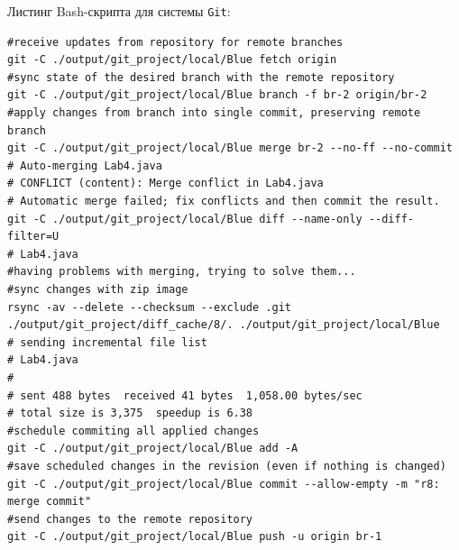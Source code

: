Листинг Bash-скрипта для системы \texttt{Git}:
\begin{lstlisting}
#receive updates from repository for remote branches
git -C ./output/git_project/local/Blue fetch origin
#sync state of the desired branch with the remote repository
git -C ./output/git_project/local/Blue branch -f br-2 origin/br-2
#apply changes from branch into single commit, preserving remote branch
git -C ./output/git_project/local/Blue merge br-2 --no-ff --no-commit
# Auto-merging Lab4.java
# CONFLICT (content): Merge conflict in Lab4.java
# Automatic merge failed; fix conflicts and then commit the result.
git -C ./output/git_project/local/Blue diff --name-only --diff-filter=U
# Lab4.java
#having problems with merging, trying to solve them...
#sync changes with zip image
rsync -av --delete --checksum --exclude .git ./output/git_project/diff_cache/8/. ./output/git_project/local/Blue
# sending incremental file list
# Lab4.java
# 
# sent 488 bytes  received 41 bytes  1,058.00 bytes/sec
# total size is 3,375  speedup is 6.38
#schedule commiting all applied changes
git -C ./output/git_project/local/Blue add -A
#save scheduled changes in the revision (even if nothing is changed)
git -C ./output/git_project/local/Blue commit --allow-empty -m "r8: merge commit"
#send changes to the remote repository
git -C ./output/git_project/local/Blue push -u origin br-1
\end{lstlisting}

